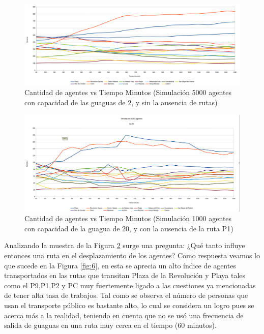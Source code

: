 \documentclass[a4paper,12pt]{article}
\begin{document}
\begin{figure}[H]
    \hspace{-3cm}
    \includegraphics[width=1.4\textwidth]{imgs/s500c2.png}
    \caption{Cantidad de agentes vs Tiempo Minutos (Simulaci\'on 5000 agentes con capacidad de las guaguas de 2, y sin la ausencia de rutas)}
    \label{fig:4}
\end{figure}
\begin{figure}[H]
    \hspace{-3cm}
    \includegraphics[width=1.4\textwidth]{imgs/s1000c20p1.png}
    \caption{Cantidad de agentes vs Tiempo Minutos (Simulaci\'on 1000 agentes con capacidad de la guagua de 20, y con la ausencia de la ruta P1)}
    \label{fig:5}
\end{figure}

Analizando la muestra de la Figura \ref{fig:5} surge una pregunta: ¿Qué tanto influye entonces una ruta en el desplazamiento de los agentes? Como respuesta veamos lo que sucede en la Figura \ref{fig:6}, en esta se aprecia un alto \'indice de agentes transportados en las rutas que transitan Plaza de la Revoluci\'on y Playa tales como el P9,P1,P2 y PC muy fuertemente ligado a las cuestiones ya mencionadas de tener alta tasa de trabajos. Tal como se observa el n\'umero de personas que usan el transporte p\'ublico es bastante alto, lo cual se considera un logro pues se acerca m\'as a la realidad, teniendo en cuenta que no se us\'o una frecuencia de salida de guaguas en una ruta muy cerca en el tiempo (60 minutos).
\end{document}
